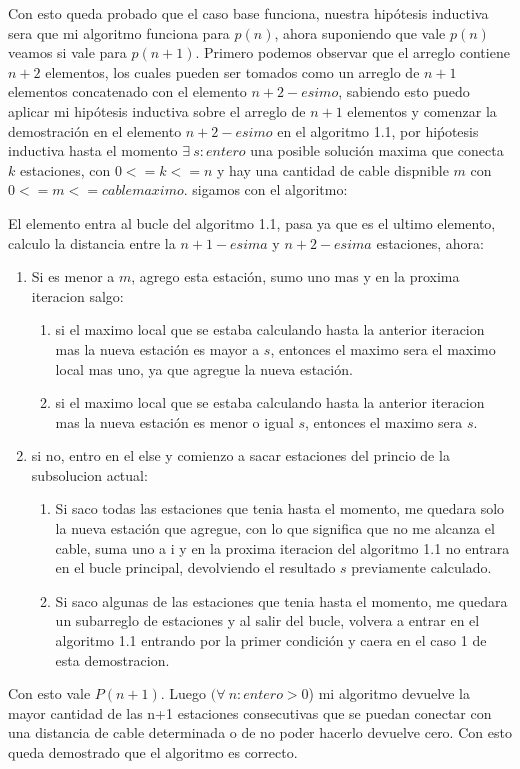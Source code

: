 Con esto queda probado que el caso base funciona, nuestra hip\'otesis inductiva sera que mi algoritmo funciona para $p(n)$, ahora suponiendo que vale $p(n)$ veamos si vale para $p(n+1)$.\newline \newline
Primero podemos observar que el arreglo contiene $n+2$ elementos, los cuales pueden ser tomados como un arreglo de $n+1$ elementos concatenado con el elemento $n+2-esimo$, sabiendo esto puedo aplicar mi hip\'otesis inductiva sobre el arreglo de $n+1$ elementos y comenzar la demostraci\'on en el elemento $n+2-esimo$ en el algoritmo 1.1, por hi\'potesis inductiva hasta el momento $\exists\ s : entero$ una posible soluci\'on maxima que conecta $k$ estaciones, con $0<= k <= n$ y hay una cantidad de cable dispnible $m$ con $0<= m <= cablemaximo$. sigamos con el algoritmo: \newline

El elemento entra al bucle del algoritmo 1.1, pasa ya que es el ultimo elemento, calculo la distancia entre la $n+1-esima$ y $n+2-esima$ estaciones, ahora:
\begin{enumerate}
    \item Si es menor a $m$, agrego esta estaci\'on, sumo uno mas y en la proxima iteracion salgo: \newline
    \begin{enumerate}
    \item si el maximo local que se estaba calculando hasta la anterior iteracion mas la nueva estaci\'on es mayor a $s$, entonces el maximo sera el maximo local mas uno, ya que agregue la nueva estaci\'on.
    \item si el maximo local que se estaba calculando hasta la anterior iteracion mas la nueva estaci\'on es menor o igual $s$, entonces el maximo sera $s$.
    \end{enumerate}
    
    \item si no, entro en el else y comienzo a sacar estaciones del princio de la subsolucion actual:
    \begin{enumerate}
    \item Si saco todas las estaciones que tenia hasta el momento, me quedara solo la nueva estaci\'on que agregue, con lo que significa que no me alcanza el cable, suma uno a i y en la proxima iteracion del algoritmo 1.1 no entrara en el bucle principal, devolviendo el resultado $s$ previamente calculado.
    \item Si saco algunas de las estaciones que tenia hasta el momento, me quedara un subarreglo de estaciones y al salir del bucle, volvera a entrar en el algoritmo 1.1 entrando por la primer condici\'on y caera en el caso 1 de esta demostracion.
    \end{enumerate}
\end{enumerate}
Con esto vale $P(n+1)$. Luego $(\forall\ n : entero > 0$) mi algoritmo devuelve la mayor cantidad de las n+1 estaciones consecutivas que se puedan conectar con una distancia de cable determinada o de no poder hacerlo devuelve cero.\newline
Con esto queda demostrado que el algoritmo es correcto.

